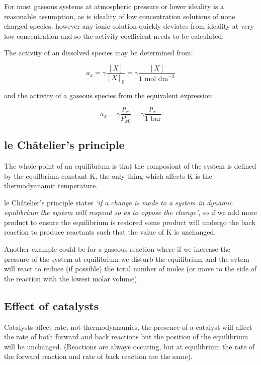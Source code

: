 \documentclass[
]{book}
\begin{document}
For most gaseous systems at atmospheric pressure or lower ideality is a reasonable assumption, as is ideality of low concentration solutions of none charged species, however any ionic solution quickly deviates from ideality at very low concentration and so the activity coefficient needs to be calculated.

The activity of an dissolved species may be determined from:

\begin{equation*}
a_x = \gamma \frac{[X]}{[X]_0}= \gamma \frac{[X]}{1 \textrm{ mol dm}^{-3}}
\end{equation*}

and the activity of a gaseous species from the equivalent expression:

\begin{equation*}
a_x =\gamma \frac{p_x}{P_{x0}}= \gamma\frac{p_x}{1 \textrm{ bar}}
\end{equation*}

\hypertarget{le-chuxe2teliers-principle}{%
\subsection{le Châtelier's principle}\label{le-chuxe2teliers-principle}}

The whole point of an equilibrium is that the composiont of the system is defined by the equilbrium constant K, the only thing which affects K is the thermodyanamic temperature.

le Châtelier's principle states \emph{`if a change is made to a system in dynamic equilibrium the system will respond so as to oppose the change'}, so if we add more product to ensure the equilibrium is restored some product will undergo the back reaction to produce reactants such that the value of K is unchanged.

Another example could be for a gaseous reaction where if we increase the pressure of the system at equilibrium we disturb the equilibrium and the sytem will react to reduce (if possible) the total number of moles (or move to the side of the reaction with the lowest molar volume).

\hypertarget{effect-of-catalysts}{%
\subsection{Effect of catalysts}\label{effect-of-catalysts}}

Catalysts affect rate, not thermodyanamics, the presence of a catalyst will affect the rate of both forward and back reactions but the position of the equilibrium will be unchanged. (Reactions are always occuring, but at equilibrium the rate of the forward reaction and rate of back reaction are the same).
\end{document}

